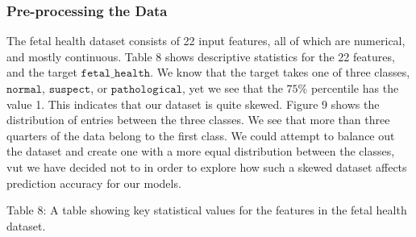 \documentclass[11pt]{article}
\begin{document}
\hypertarget{pre-processing-the-data2}{%
	\subsubsection{Pre-processing the Data}\label{pre-processing-the-data2}}
The fetal health dataset consists of 22 input features, all of which are numerical, and mostly continuous. Table 8 shows descriptive statistics for the 22 features, and the target $\texttt{fetal\_health}$. We know that the target takes one of three classes, $\texttt{normal}$, $\texttt{suspect}$, or $\texttt{pathological}$, yet we see that the $75\%$ percentile has the value 1. This indicates that our dataset is quite skewed. 
Figure 9 shows the distribution of entries between the three classes. We see that more than three quarters of the data belong to the first class. We could attempt to balance out the dataset and create one with a more equal distribution between the classes, vut we have decided not to in order to explore how such a skewed dataset affects prediction accuracy for our models.

Table 8: A table showing key statistical values for the features in the fetal health dataset.
\end{document}
